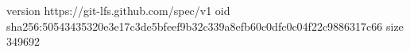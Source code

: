 version https://git-lfs.github.com/spec/v1
oid sha256:50543435320e3e17c3de5bfeef9b32c339a8efb60c0dfc0c04f22c9886317c66
size 349692
